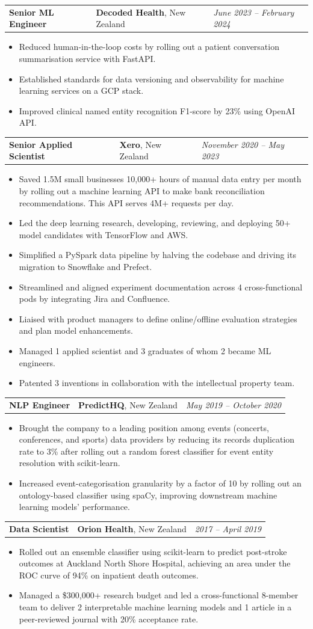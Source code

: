 \documentclass[letterpaper,11pt]{article}
\newcommand{\resumeItemListStart}{\begin{itemize}[label=$\circ$, topsep=0.06cm, parsep=0cm, partopsep=0cm, itemsep=0.06cm, leftmargin=0.4cm]}
\newcommand{\resumeItem}[1]{\item\small{#1}}
\newcommand{\resumeItemListEnd}{\end{itemize}}
\newcommand{\job}[4]{
    \begin{tabular}{p{7cm}p{6cm}p{5cm}}
      \hspace{-0.7em} \textbf{#1} & \textbf{\small{#2}}\scriptsize{, #3} & \hfill \textit{\small{#4}}
    \end{tabular}
}
\begin{document}
\job {Senior ML Engineer}{Decoded Health}{New Zealand}{June 2023 -- February 2024}
\resumeItemListStart
\resumeItem {Reduced human-in-the-loop costs by rolling out a patient conversation summarisation service with FastAPI.}
\resumeItem {Established standards for data versioning and observability for machine learning services on a GCP stack.}
\resumeItem {Improved clinical named entity recognition F1-score by 23\% using OpenAI API.}
\resumeItemListEnd \vspace{0.2cm}

\job {Senior Applied Scientist}{Xero}{New Zealand}{November 2020 -- May 2023}
\resumeItemListStart
\resumeItem {Saved 1.5M small businesses 10,000+ hours of manual data entry per month by rolling out a machine learning API to make bank reconciliation recommendations. This API serves 4M+ requests per day.}
\resumeItem {Led the deep learning research, developing, reviewing, and deploying 50+ model candidates with TensorFlow and AWS.}
\resumeItem {Simplified a PySpark data pipeline by halving the codebase and driving its migration to Snowflake and Prefect.}
\resumeItem {Streamlined and aligned experiment documentation across 4 cross-functional pods by integrating Jira and Confluence.}
\resumeItem {Liaised with product managers to define online/offline evaluation strategies and plan model enhancements.}
\resumeItem {Managed 1 applied scientist and 3 graduates of whom 2 became ML engineers.}
\resumeItem {Patented 3 inventions in collaboration with the intellectual property team.}
\resumeItemListEnd \vspace{0.2cm}

\job {NLP Engineer}{PredictHQ}{New Zealand}{May 2019 -- October 2020}
\resumeItemListStart
\resumeItem {Brought the company to a leading position among events (concerts, conferences, and sports) data providers by reducing its records duplication rate to 3\% after rolling out a random forest classifier for event entity resolution with scikit-learn.}
\resumeItem {Increased event-categorisation granularity by a factor of 10 by rolling out an ontology-based classifier using spaCy, improving downstream machine learning models' performance.}
\resumeItemListEnd \vspace{0.2cm}
	
\job {Data Scientist}{Orion Health}{New Zealand}{2017 -- April 2019}
\resumeItemListStart
\resumeItem {Rolled out an ensemble classifier using scikit-learn to predict post-stroke outcomes at Auckland North Shore Hospital, achieving an area under the ROC curve of 94\% on inpatient death outcomes.}
\resumeItem {Managed a \$300,000+ research budget and led a cross-functional 8-member team to deliver 2 interpretable machine learning models and 1 article in a peer-reviewed journal with 20\% acceptance rate.}
\resumeItemListEnd \vspace{0.2cm}
\end{document}
